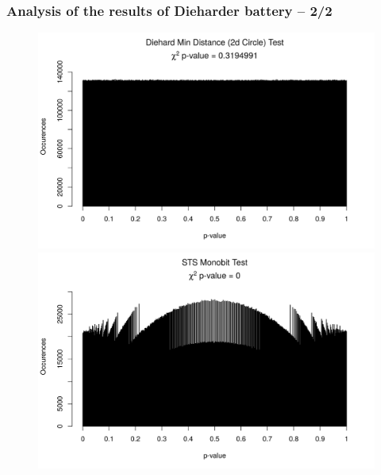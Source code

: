 \documentclass[aspectratio=169]{beamer}
\begin{document}
\begin{frame}
\frametitle{Analysis of the results of Dieharder battery -- 2/2}

\begin{figure}
\begin{nomar}
\centering
\includegraphics[width=.45\paperwidth]{figures/011.png} 
\includegraphics[width=.45\paperwidth]{figures/100.png}
\end{nomar}
\end{figure}

\end{frame}
\end{document}
